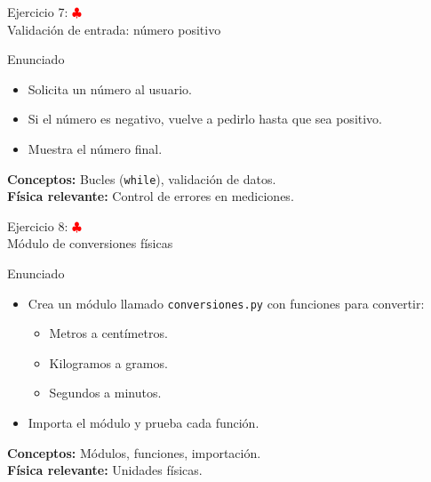 \documentclass[10pt]{beamer}
\begin{document}
\begin{frame}{Ejercicio 7: \hfill \textcolor{red}{$\clubsuit$} \\ Validación de entrada: número positivo}
  \begin{block}{Enunciado}
    \begin{itemize}
      \item Solicita un número al usuario.
      \item Si el número es negativo, vuelve a pedirlo hasta que sea positivo.
      \item Muestra el número final.
    \end{itemize}
  \end{block}
  \textbf{Conceptos:} Bucles (\texttt{while}), validación de datos.\\
  \textbf{Física relevante:} Control de errores en mediciones.
\end{frame}

\begin{frame}{Ejercicio 8: \hfill \textcolor{red}{$\clubsuit$} \\ Módulo de conversiones físicas}
  \begin{block}{Enunciado}
    \begin{itemize}
      \item Crea un módulo llamado \texttt{conversiones.py} con funciones para convertir:
        \begin{itemize}
          \item Metros a centímetros.
          \item Kilogramos a gramos.
          \item Segundos a minutos.
        \end{itemize}
      \item Importa el módulo y prueba cada función.
    \end{itemize}
  \end{block}
  \textbf{Conceptos:} Módulos, funciones, importación.\\
  \textbf{Física relevante:} Unidades físicas.
\end{frame}
\end{document}
